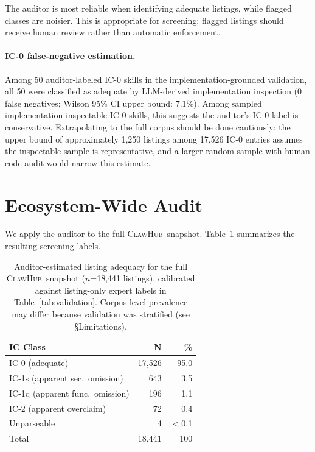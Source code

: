 \documentclass[11pt]{article}
\newcommand{\clawhub}{\textsc{ClawHub}\xspace}
\begin{document}
The auditor is most reliable when identifying adequate
listings, while flagged classes are noisier.
This is appropriate for screening: flagged listings should
receive human review rather than automatic enforcement.

\paragraph{IC-0 false-negative estimation.}
Among 50 auditor-labeled IC-0 skills in the
implementation-grounded validation, all 50 were classified as
adequate by LLM-derived implementation inspection
(0 false negatives; Wilson 95\% CI upper bound: 7.1\%).
Among sampled implementation-inspectable IC-0 skills,
this suggests the auditor's IC-0 label is conservative.
Extrapolating to the full corpus should be done cautiously:
the upper bound of approximately 1,250 listings among
17,526 IC-0 entries assumes the inspectable sample is
representative, and a larger random sample with human
code audit would narrow this estimate.

\section{Ecosystem-Wide Audit}
\label{sec:audit}

We apply the auditor to the full \clawhub\ snapshot.
Table~\ref{tab:ic_dist} summarizes the resulting screening
labels.

\begin{table}[t]
\centering\small
\begin{tabular}{lrr}
\toprule
\textbf{IC Class} & \textbf{N} & \textbf{\%} \\
\midrule
IC-0 (adequate)         & 17{,}526 & 95.0 \\
IC-1s (apparent sec.\ omission)  & 643      & 3.5 \\
IC-1q (apparent func.\ omission)& 196      & 1.1 \\
IC-2 (apparent overclaim)       & 72       & 0.4 \\
Unparseable                     & 4        & $<$0.1 \\
\midrule
Total                   & 18{,}441 & 100 \\
\bottomrule
\end{tabular}
\caption{Auditor-estimated listing adequacy for the
full \clawhub\ snapshot ($n$=18{,}441 listings),
calibrated against listing-only expert labels in
Table~\ref{tab:validation}.
Corpus-level prevalence may differ because validation
was stratified (see \S Limitations).}
\label{tab:ic_dist}
\end{table}
\end{document}
